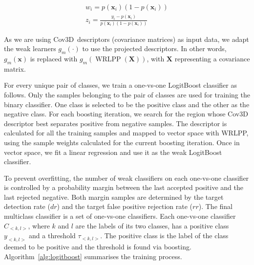 \documentclass[10pt,twocolumn,letterpaper]{article}
\newcommand{\alg}[1]{\mbox{Algorithm~\ref{#1}}}
\newcommand{\eqsize}{\footnotesize}
\newcommand{\cov}{{Cov3D}}
\newcommand{\wrlpp}{WRLPP}
\newcommand{\vect}[1]{{\boldsymbol{#1}}}
\newcommand{\mat}[1]{{\boldsymbol{#1}}}
\begin{document}
\noindent
\eqsize
\begin{align}
  w_i = p(\vect{x}_i)(1-p(\vect{x}_i))\\
  z_i = \frac{y_i-p(\vect{x}_i)}{p(\vect{x}_i)(1-p(\vect{x}_i))}
\end{align}
\normalsize

As we are using \cov~descriptors (covariance matrices) as input data,
we adapt the weak learners {\eqsize $g_m(\vect{\cdot})$} to use the projected descriptors.
In other words, {\eqsize $g_m(\vect{x})$} is replaced with {\eqsize $g_m(\operatorname{WRLPP}(\mat{X}))$},
with {\eqsize $\mat{X}$} representing a covariance matrix.


For every unique pair of classes, we train a one-vs-one LogitBoost classifier as follows.
Only the samples belonging to the pair of classes are used for training the binary classifier.
One class is selected to be the positive class and the other as the negative class.
For each boosting iteration, we search for the region whose {\cov} descriptor best separates positive from negative samples. The descriptor is
calculated for all the training samples and mapped to vector space with \wrlpp, using the sample weights calculated for the current boosting
iteration. Once in vector space, we fit a linear regression and use it as the weak LogitBoost classifier.

To prevent overfitting, the number of weak classifiers on each one-vs-one classifier
is controlled by a probability margin between the last accepted positive and the last rejected negative.
Both margin samples are determined by the target detection rate ({\eqsize $dr$}) and the target false positive rejection rate ({\eqsize $rr$}).
The final multiclass classifier is a set of one-vs-one classifiers.
Each one-vs-one classifier {\eqsize $C_{<k,l>}$}, where {\eqsize $k$} and {\eqsize $l$} are the labels of its two classes, has a positive class
{\eqsize $y_{<k,l>}$} and a threshold {\eqsize $\tau_{<k,l>}$}. The positive class is the label of the class deemed to be positive and the threshold
is found via boosting.
\alg{alg:logitboost} summarises the training process.
\end{document}
